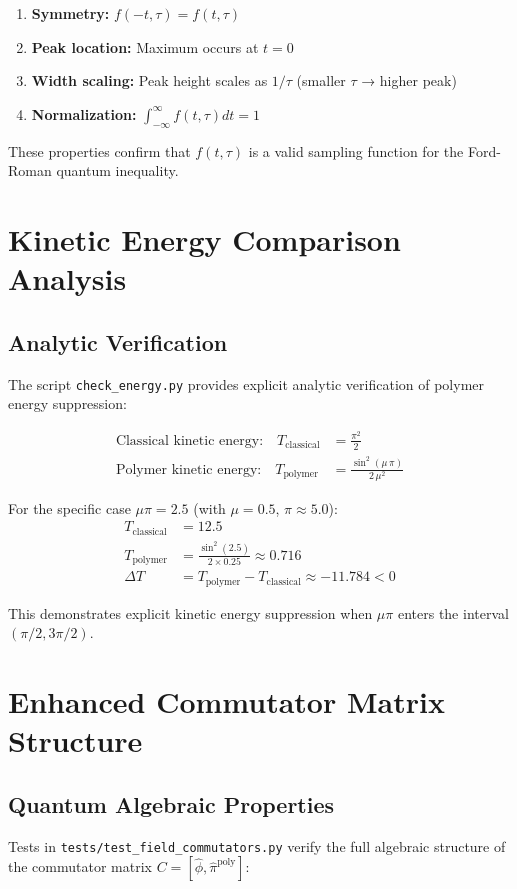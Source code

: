 \documentclass[11pt]{article}
\begin{document}
\begin{enumerate}
\item \textbf{Symmetry:} $f(-t,\tau) = f(t,\tau)$ 
\item \textbf{Peak location:} Maximum occurs at $t = 0$
\item \textbf{Width scaling:} Peak height scales as $1/\tau$ (smaller $\tau$ → higher peak)
\item \textbf{Normalization:} $\int_{-\infty}^{\infty} f(t,\tau) dt = 1$
\end{enumerate}

These properties confirm that $f(t,\tau)$ is a valid sampling function for the Ford-Roman quantum inequality.

\section{Kinetic Energy Comparison Analysis}

\subsection{Analytic Verification}
The script \texttt{check\_energy.py} provides explicit analytic verification of polymer energy suppression:

\begin{align}
\text{Classical kinetic energy:} \quad T_{\text{classical}} &= \frac{\pi^2}{2} \\
\text{Polymer kinetic energy:} \quad T_{\text{polymer}} &= \frac{\sin^2(\mu\,\pi)}{2\,\mu^2}
\end{align}

For the specific case $\mu\pi = 2.5$ (with $\mu = 0.5$, $\pi \approx 5.0$):
\begin{align}
T_{\text{classical}} &= 12.5 \\
T_{\text{polymer}} &= \frac{\sin^2(2.5)}{2 \times 0.25} \approx 0.716 \\
\Delta T &= T_{\text{polymer}} - T_{\text{classical}} \approx -11.784 < 0
\end{align}

This demonstrates explicit kinetic energy suppression when $\mu\pi$ enters the interval $(\pi/2, 3\pi/2)$.

\section{Enhanced Commutator Matrix Structure}

\subsection{Quantum Algebraic Properties}
Tests in \texttt{tests/test\_field\_commutators.py} verify the full algebraic structure of the commutator matrix $C = [\hat{\phi}, \hat{\pi}^{\text{poly}}]$:
\end{document}
